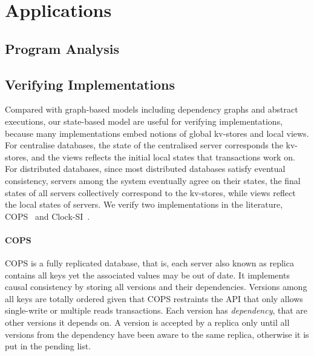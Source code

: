 \section{Applications}
\label{sec:applications}

\subsection{Program Analysis}

\subsection{Verifying Implementations}
Compared with graph-based models including dependency graphs and abstract executions,
our state-based model are useful for verifying implementations,
because many implementations embed notions of global kv-stores and local views.
For centralise databases, the state of the centralised server corresponds the kv-stores,
and the views reflects the initial local states that transactions work on.
For distributed databases, since most distributed databases satisfy eventual consistency, 
\ie servers among the system eventually agree on their states,
the final states of all servers collectively correspond to the kv-stores,
while views reflect the local states of servers.
We verify two implementations in the literature, COPS~\cite{Lloyd:2011:DSE:2043556.2043593} and Clock-SI~\cite{Du:2013:CSI:2553409.2553434}.

\paragraph{\bf COPS}
COPS is a fully replicated database, that is, each server also known as replica contains all keys yet the associated values may be out of date.
It implements causal consistency by storing all versions and their dependencies.
Versions among all keys are totally ordered given that COPS restraints the API that only allows single-write or multiple reads transactions.
Each version has \emph{dependency}, that are other versions it depends on.
A version is accepted by a replica
only until all versions from the dependency have been aware to the same replica,
otherwise it is put in the pending list.


